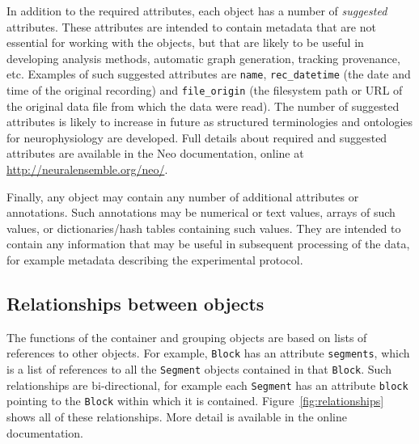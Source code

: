 \documentclass{frontiers}
\newcommand{\documentation}{\url{http://neuralensemble.org/neo/}}
\begin{document}
In addition to the required attributes, each object has a number of \emph{suggested} attributes.
These attributes are intended to contain metadata that are not essential for working with the objects, but that are likely to be useful in developing analysis methods, automatic graph generation, tracking provenance, etc.
Examples of such suggested attributes are \lstinline`name`, \lstinline`rec_datetime` (the date and time of the original recording) and \lstinline`file_origin` (the filesystem path or URL of the original data file from which the data were read).
The number of suggested attributes is likely to increase in future as structured terminologies and ontologies for neurophysiology are developed.
Full details about required and suggested attributes are available in the Neo documentation, online at \documentation.

Finally, any object may contain any number of additional attributes or annotations.
Such annotations may be numerical or text values, arrays of such values, or dictionaries/hash tables containing such values.
They are intended to contain any information that may be useful in subsequent processing of the data, for example metadata describing the experimental protocol.


\subsection{Relationships between objects}

The functions of the container and grouping objects are based on lists of references to other objects.
For example, \lstinline`Block` has an attribute \lstinline`segments`, which is a list of references to all the \lstinline`Segment` objects contained in that \lstinline`Block`.
Such relationships are bi-directional, for example each \lstinline`Segment` has an attribute \lstinline`block` pointing to the \lstinline`Block` within which it is contained.
Figure~\ref{fig:relationships} shows all of these relationships.
More detail is available in the online documentation.
\end{document}
